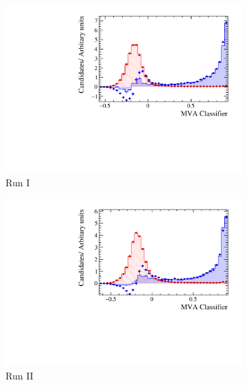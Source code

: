 \begin{figure}[!h]
   \centering
   \begin{subfigure}[t]{0.32\textwidth}
      \centering
      \includegraphics[width=1.0\textwidth]{figs/Selection/Phi_BDT_classifier_Run1.pdf}
      \caption{Run I \decay{\phiz}{\Kp\Km}}
   \end{subfigure}
   \begin{subfigure}[t]{0.32\textwidth}
      \centering
      \includegraphics[width=1.0\textwidth]{figs/Selection/Phi_BDT_classifier_Run2.pdf}
      \caption{Run II \decay{\phiz}{\Kp\Km}}
   \end{subfigure}\\
   \begin{subfigure}[t]{0.32\textwidth}
      \centering

\end{subfigure}
\end{figure}
